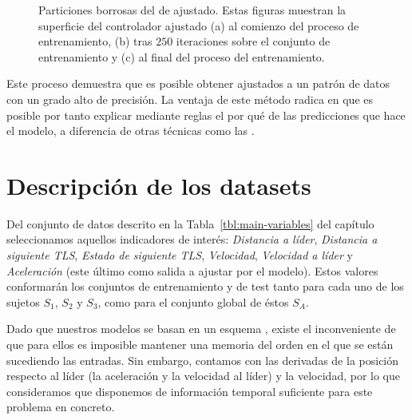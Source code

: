 \begin{figure}
	\centering
	\qquad
	\qquad
	\caption[Evolución del  de acuerdo al conjunto de datos extraido del ]{Particiones borrosas del  de ajustado. Estas figuras muestran la superficie del controlador ajustado (a) al comienzo del proceso de entrenamiento, (b) tras $250$ iteraciones sobre el conjunto de entrenamiento y (c) al final del proceso del entrenamiento.}
	\label{fig:adjusted-tip-controller-training}
\end{figure}

Este proceso demuestra que es posible obtener  ajustados a un patrón de datos con un grado alto de precisión. La ventaja de este método radica en que es posible por tanto explicar mediante reglas el por qué de las predicciones que hace el modelo, a diferencia de otras técnicas como las .

\section{Descripción de los datasets}

Del conjunto de datos descrito en la Tabla~\ref{tbl:main-variables} del capítulo~ seleccionamos aquellos indicadores de interés: \textit{Distancia a líder}, \textit{Distancia a siguiente TLS}, \textit{Estado de siguiente TLS}, \textit{Velocidad}, \textit{Velocidad a líder} y \textit{Aceleración} (este último como salida a ajustar por el modelo). Estos valores conformarán los conjuntos de entrenamiento y de test tanto para cada uno de los sujetos $S_1$, $S_2$ y $S_3$, como para el conjunto global de éstos $S_A$.

Dado que nuestros modelos se basan en un esquema \textit{}, existe el inconveniente de que para ellos es imposible mantener una memoria del orden en el que se están sucediendo las entradas. Sin embargo, contamos con las derivadas de la posición respecto al líder (la aceleración y la velocidad al líder) y la velocidad, por lo que consideramos que disponemos de información temporal suficiente para este problema en concreto.

